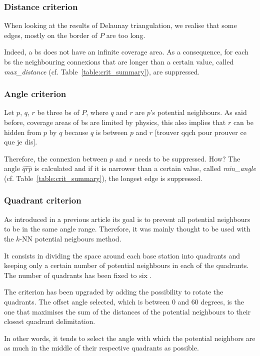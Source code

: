 \documentclass[lettersize,journal,english]{IEEEtran}
\begin{document}
\subsubsection{Distance criterion}
When looking at the results of Delaunay triangulation, we realise that some edges, mostly on the border of $P$ are too long.

Indeed, a \acrshort{bs} does not have an infinite coverage area. As a consequence, for each \acrshort{bs} the neighbouring connexions that are longer than a certain value, called \emph{max\_distance} (cf. Table~\ref{table:crit_summary}), are suppressed.

\subsubsection{Angle criterion}
Let $p$, $q$, $r$ be three \acrshort{bs} of $P$, where $q$ and $r$ are $p$'s potential neighbours. As said before, coverage areas of \acrshort{bs} are limited by physics, this also implies that $r$ can be \og hidden\fg{} from $p$ by $q$ because $q$ is between $p$ and $r$ [trouver qqch pour prouver ce que je dis].

Therefore, the connexion between $p$ and $r$ needs to be suppressed. How? The angle $\widehat{qrp}$ is calculated and if it is narrower than a certain value, called \emph{min\_angle} (cf. Table~\ref{table:crit_summary}), the longest edge is suppressed.

\subsubsection{Quadrant criterion}
As introduced in a previous article \cite{10201211} its goal is to prevent all potential neighbours to be in the same angle range. Therefore, it was mainly thought to be used with the 
$k$-NN potential neigbours method.

It consists in dividing the space around each base station into quadrants and keeping only a certain number of potential neighbours
in each of the quadrants. The number of quadrants has been fixed to six \cite{art_del_paq}.

The criterion has been upgraded by adding the possibility to rotate the quadrants. The offset angle selected, which is between $0$ and 
$60$ degrees, is the one that maximises the sum of the distances of the potential neighbours to their closest quadrant delimitation.

In other words, it tends to select the angle with which the potential neighbors are as much in the middle of their respective quadrants
as possible.
\end{document}
